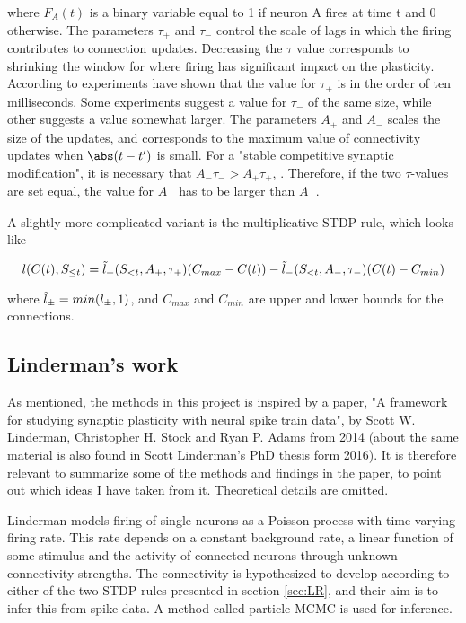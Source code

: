 where $F_A(t)$ is a binary variable equal to 1 if neuron A fires at time t and 0 otherwise. The parameters $\tau_+$ and $\tau_-$ control the scale of lags in which the firing contributes to connection updates. Decreasing the $\tau$ value corresponds to shrinking the window for where firing has significant impact on the plasticity. According to \cite{Song} experiments have shown that the value for $\tau_+$ is in the order of ten milliseconds. Some experiments suggest a value for $\tau_-$ of the same size, while other suggests a value somewhat larger. The parameters $A_+$ and $A_-$ scales the size of the updates, and corresponds to the maximum value of connectivity updates when $\abs (t-t')$ is small. For a "stable competitive synaptic modification", it is necessary that $A_-\tau_- > A_+\tau_+$, \cite{Song}. Therefore, if the two $\tau$-values are set equal, the value for $A_-$ has to be larger than $A_+$.

A slightly more complicated variant is the multiplicative STDP rule, which looks like

\begin{equation}
    l(C(t), S_{\leq t}) = \Tilde{l}_+(S_{<t}, A_+,\tau_+)(C_{max} - C(t))  - \Tilde{l}_-(S_{<t}, A_-,\tau_-)(C(t) - C_{min})
\end{equation}

where $\Tilde{l}_{\pm} = min(l_{\pm},1)$, and $C_{max}$ and $C_{min}$ are upper and lower bounds for the connections. 

\subsection{Linderman's work}
\label{Linderman}
As mentioned, the methods in this project is inspired by a paper, "A framework for studying synaptic plasticity with neural spike train data", by Scott W. Linderman, Christopher H. Stock and Ryan P. Adams from 2014 (about the same material is also found in Scott Linderman's PhD thesis form 2016). It is therefore relevant to summarize some of the methods and findings in the paper, to point out which ideas I have taken from it. Theoretical details are omitted.

Linderman models firing of single neurons as a Poisson process with time varying firing rate. This rate depends on a constant background rate, a linear function of some stimulus and the activity of connected neurons through unknown connectivity strengths. The connectivity is hypothesized to develop according to either of the two STDP rules presented in section \ref{sec:LR}, and their aim is to infer this from spike data. A method called particle MCMC is used for inference. 

